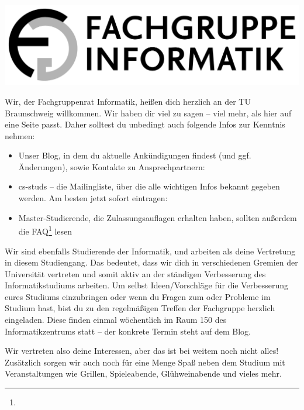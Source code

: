 \documentclass[
  a4paper,              %
  style=screen,
  nexus,                %
]{tubsartcl}
\begin{document}
\pagestyle{empty}


\begin{center}
\noindent\includegraphics[width=.5\textwidth]{bilder/fg-logo/fg-logo.pdf}
\end{center}

\listoftodos

\begin{multicols}{2}

\noindent{}Wir, der Fachgruppenrat Informatik, heißen dich herzlich an der TU Braunschweig willkommen. 
Wir haben dir viel zu sagen – viel mehr, als hier auf eine Seite passt. Daher solltest du unbedingt auch folgende Infos zur Kenntnis nehmen:

\begin{itemize}[topsep=0em,itemsep=-1ex,partopsep=0em,parsep=1ex]
\item Unser Blog, in dem du aktuelle Ankündigungen findest (und ggf. Änderungen), sowie Kontakte zu Ansprechpartnern: \\\fginfoUrl

\item cs-studs -- die Mailingliste, über die alle wichtigen Infos bekannt gegeben werden. Am besten jetzt sofort eintragen: \\

\item Master-Studierende, die Zulassungsauflagen erhalten haben, sollten außerdem die FAQ\footnote{} lesen
\end{itemize}

\noindent{}Wir sind ebenfalls Studierende der Informatik, und arbeiten als deine Vertretung in diesem Studiengang. Das bedeutet, dass wir dich in verschiedenen Gremien der Universität vertreten und somit aktiv an der ständigen Verbesserung des Informatikstudiums arbeiten. Um selbst Ideen/Vorschläge für die Verbesserung eures Studiums einzubringen oder wenn du Fragen zum oder Probleme im Studium hast, bist du zu den regelmäßigen Treffen der Fachgruppe herzlich eingeladen. Diese finden einmal wöchentlich im Raum 150 des Informatikzentrums statt – der konkrete Termin steht auf dem Blog.

Wir vertreten also deine Interessen, aber das ist bei weitem noch nicht alles! Zusätzlich sorgen wir auch noch für eine Menge Spaß neben dem Studium mit Veranstaltungen wie Grillen, Spieleabende, Glühweinabende und vieles mehr.


\end{multicols}
\end{document}
